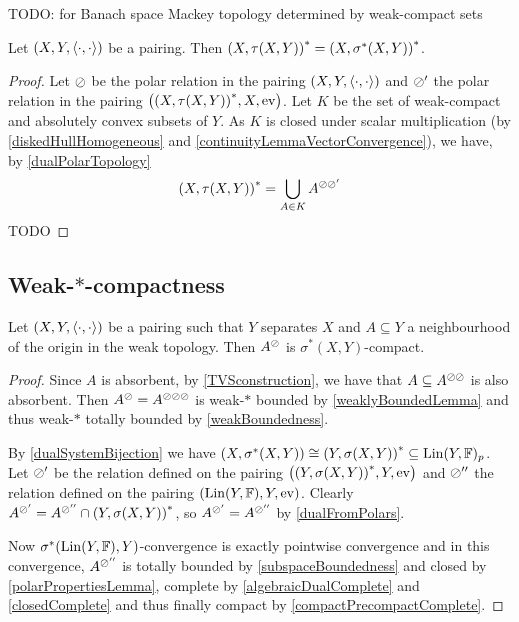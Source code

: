 TODO: for Banach space Mackey topology determined by weak-compact sets

\begin{proposition}
Let $\sSet{X,Y,\pair{\cdot,\cdot}}$ be a pairing. Then $\dual{\sSet{X, \tau(X,Y)}} = \dual{\sSet{X, \sigma^*(X,Y)}}$.
\end{proposition}
\begin{proof}
Let $\oslash$ be the polar relation in the pairing $\sSet{X,Y,\pair{\cdot,\cdot}}$ and $\oslash'$ the polar relation in the pairing $\sSet{\dual{\sSet{X, \tau(X,Y)}}, X, \evalMap}$. Let $K$ be the set of weak-compact and absolutely convex subsets of $Y$. As $K$ is closed under scalar multiplication (by \ref{diskedHullHomogeneous} and \ref{continuityLemmaVectorConvergence}), we have, by \ref{dualPolarTopology}
\[ \dual{\sSet{X, \tau(X,Y)}} = \bigcup_{A\in K}A^{\pol\pol'} \]
TODO
\end{proof}


\subsection{Weak-$*$-compactness}
\begin{theorem} \label{alaogluTheorem}
Let $(X,Y,\left\langle \cdot,\cdot \right\rangle)$ be a pairing such that $Y$ separates $X$ and $A\subseteq Y$ a neighbourhood of the origin in the weak topology. Then $A^\oslash$ is $\sigma^*(X,Y)$-compact.
\end{theorem}
\begin{proof}
Since $A$ is absorbent, by \ref{TVSconstruction}, we have that $A\subseteq A^{\oslash\oslash}$ is also absorbent. Then $A^\oslash = A^{\oslash\oslash\oslash}$ is weak-$*$ bounded by \ref{weaklyBoundedLemma} and thus weak-$*$ totally bounded by \ref{weakBoundedness}.

By \ref{dualSystemBijection} we have $\sSet{X, \sigma^*(X,Y)} \cong \dual{\sSet{Y, \sigma(X,Y)}} \subseteq \Lin(Y, \F)_p$. Let $\oslash'$ be the relation defined on the pairing $\sSet{\dual{\sSet{Y, \sigma(X,Y)}},Y, \evalMap}$ and $\oslash^{\prime\prime}$ the relation defined on the pairing $\sSet{\Lin(Y, \F),Y, \evalMap}$. Clearly $A^{\pol'} = A^{\pol^{\prime\prime}} \cap \dual{\sSet{Y, \sigma(X,Y)}}$, so $A^{\oslash'} = A^{\oslash^{\prime\prime}}$ by \ref{dualFromPolars}.

Now $\sigma^*(\operatorname{Lin}(Y, \mathbb{F}), Y)$-convergence is exactly pointwise convergence and in this convergence, $A^{\oslash^{\prime\prime}}$ is totally bounded by \ref{subspaceBoundedness} and closed by \ref{polarPropertiesLemma}, complete by \ref{algebraicDualComplete} and \ref{closedComplete} and thus finally compact by \ref{compactPrecompactComplete}.
\end{proof}

